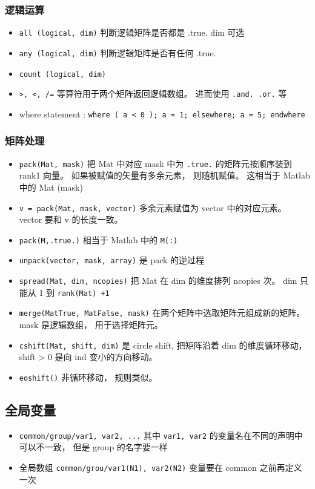 \subsubsection{逻辑运算}
\begin{itemize}
\item \verb`all (logical, dim)` 判断逻辑矩阵是否都是 .true.  dim 可选
\item \verb`any (logical, dim)` 判断逻辑矩阵是否有任何 .true.
\item \verb`count (logical, dim) `
\item \verb`>, <, /=` 等算符用于两个矩阵返回逻辑数组。 进而使用 \verb`.and. .or.` 等
\item where statement : 
\verb`where ( a < 0 ); a = 1; elsewhere; a = 5; endwhere`
\end{itemize}

\subsubsection{矩阵处理}
\begin{itemize}
\item \verb`pack(Mat, mask)` 把 Mat 中对应 mask 中为 \verb`.true.` 的矩阵元按顺序装到 rank1 向量。 如果被赋值的矢量有多余元素， 则随机赋值。 这相当于 Matlab 中的 Mat (mask)
\item \verb`v = pack(Mat, mask, vector)` 多余元素赋值为 vector 中的对应元素。 vector 要和 v 的长度一致。
\item \verb`pack(M,.true.)` 相当于 Matlab 中的 \verb`M(:)`
\item \verb`unpack(vector, mask, array)` 是 pack 的逆过程
\item \verb`spread(Mat, dim, ncopies)` 把 Mat 在 dim 的维度排列 ncopies 次。 dim 只能从 1 到 \verb`rank(Mat) +1`
\item \verb`merge(MatTrue, MatFalse, mask)` 在两个矩阵中选取矩阵元组成新的矩阵。 mask 是逻辑数组， 用于选择矩阵元。
\item \verb`cshift(Mat, shift, dim)` 是 circle shift, 把矩阵沿着 dim 的维度循环移动， shift > 0 是向 ind 变小的方向移动。
\item \verb`eoshift()` 非循环移动， 规则类似。
\end{itemize}

\subsection{全局变量}
\begin{itemize}
\item \verb`common/group/var1, var2, ...` 其中 \verb`var1, var2` 的变量名在不同的声明中可以不一致， 但是 group 的名字要一样
\item 全局数组 \verb`common/grou/var1(N1), var2(N2)` 变量要在 common 之前再定义一次
\end{itemize}

